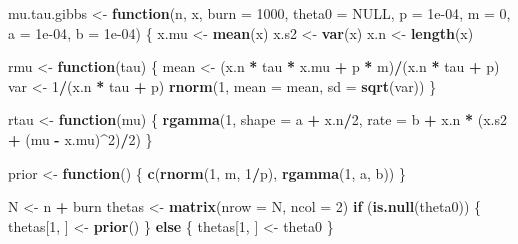 \documentclass[
  11pt,
]{paper}
\newenvironment{Shaded}{\begin{snugshade}}{\end{snugshade}}
\newcommand{\AttributeTok}[1]{\textcolor[rgb]{0.13,0.29,0.53}{#1}}
\newcommand{\ConstantTok}[1]{\textcolor[rgb]{0.56,0.35,0.01}{#1}}
\newcommand{\ControlFlowTok}[1]{\textcolor[rgb]{0.13,0.29,0.53}{\textbf{#1}}}
\newcommand{\DecValTok}[1]{\textcolor[rgb]{0.00,0.00,0.81}{#1}}
\newcommand{\FloatTok}[1]{\textcolor[rgb]{0.00,0.00,0.81}{#1}}
\newcommand{\FunctionTok}[1]{\textcolor[rgb]{0.13,0.29,0.53}{\textbf{#1}}}
\newcommand{\NormalTok}[1]{#1}
\newcommand{\OtherTok}[1]{\textcolor[rgb]{0.56,0.35,0.01}{#1}}
\newcommand{\SpecialCharTok}[1]{\textcolor[rgb]{0.81,0.36,0.00}{\textbf{#1}}}
\begin{document}
\begin{Shaded}
\begin{Highlighting}[]
\NormalTok{mu.tau.gibbs }\OtherTok{\textless{}{-}} \ControlFlowTok{function}\NormalTok{(n, x, }\AttributeTok{burn =} \DecValTok{1000}\NormalTok{, }\AttributeTok{theta0 =} \ConstantTok{NULL}\NormalTok{, }\AttributeTok{p =} \FloatTok{1e{-}04}\NormalTok{, }\AttributeTok{m =} \DecValTok{0}\NormalTok{, }\AttributeTok{a =} \FloatTok{1e{-}04}\NormalTok{,}
    \AttributeTok{b =} \FloatTok{1e{-}04}\NormalTok{) \{}
\NormalTok{    x.mu }\OtherTok{\textless{}{-}} \FunctionTok{mean}\NormalTok{(x)}
\NormalTok{    x.s2 }\OtherTok{\textless{}{-}} \FunctionTok{var}\NormalTok{(x)}
\NormalTok{    x.n }\OtherTok{\textless{}{-}} \FunctionTok{length}\NormalTok{(x)}

\NormalTok{    rmu }\OtherTok{\textless{}{-}} \ControlFlowTok{function}\NormalTok{(tau) \{}
\NormalTok{        mean }\OtherTok{\textless{}{-}}\NormalTok{ (x.n }\SpecialCharTok{*}\NormalTok{ tau }\SpecialCharTok{*}\NormalTok{ x.mu }\SpecialCharTok{+}\NormalTok{ p }\SpecialCharTok{*}\NormalTok{ m)}\SpecialCharTok{/}\NormalTok{(x.n }\SpecialCharTok{*}\NormalTok{ tau }\SpecialCharTok{+}\NormalTok{ p)}
\NormalTok{        var }\OtherTok{\textless{}{-}} \DecValTok{1}\SpecialCharTok{/}\NormalTok{(x.n }\SpecialCharTok{*}\NormalTok{ tau }\SpecialCharTok{+}\NormalTok{ p)}
        \FunctionTok{rnorm}\NormalTok{(}\DecValTok{1}\NormalTok{, }\AttributeTok{mean =}\NormalTok{ mean, }\AttributeTok{sd =} \FunctionTok{sqrt}\NormalTok{(var))}
\NormalTok{    \}}

\NormalTok{    rtau }\OtherTok{\textless{}{-}} \ControlFlowTok{function}\NormalTok{(mu) \{}
        \FunctionTok{rgamma}\NormalTok{(}\DecValTok{1}\NormalTok{, }\AttributeTok{shape =}\NormalTok{ a }\SpecialCharTok{+}\NormalTok{ x.n}\SpecialCharTok{/}\DecValTok{2}\NormalTok{, }\AttributeTok{rate =}\NormalTok{ b }\SpecialCharTok{+}\NormalTok{ x.n }\SpecialCharTok{*}\NormalTok{ (x.s2 }\SpecialCharTok{+}\NormalTok{ (mu }\SpecialCharTok{{-}}\NormalTok{ x.mu)}\SpecialCharTok{\^{}}\DecValTok{2}\NormalTok{)}\SpecialCharTok{/}\DecValTok{2}\NormalTok{)}
\NormalTok{    \}}

\NormalTok{    prior }\OtherTok{\textless{}{-}} \ControlFlowTok{function}\NormalTok{() \{}
        \FunctionTok{c}\NormalTok{(}\FunctionTok{rnorm}\NormalTok{(}\DecValTok{1}\NormalTok{, m, }\DecValTok{1}\SpecialCharTok{/}\NormalTok{p), }\FunctionTok{rgamma}\NormalTok{(}\DecValTok{1}\NormalTok{, a, b))}
\NormalTok{    \}}

\NormalTok{    N }\OtherTok{\textless{}{-}}\NormalTok{ n }\SpecialCharTok{+}\NormalTok{ burn}
\NormalTok{    thetas }\OtherTok{\textless{}{-}} \FunctionTok{matrix}\NormalTok{(}\AttributeTok{nrow =}\NormalTok{ N, }\AttributeTok{ncol =} \DecValTok{2}\NormalTok{)}
    \ControlFlowTok{if}\NormalTok{ (}\FunctionTok{is.null}\NormalTok{(theta0)) \{}
\NormalTok{        thetas[}\DecValTok{1}\NormalTok{, ] }\OtherTok{\textless{}{-}} \FunctionTok{prior}\NormalTok{()}
\NormalTok{    \} }\ControlFlowTok{else}\NormalTok{ \{}
\NormalTok{        thetas[}\DecValTok{1}\NormalTok{, ] }\OtherTok{\textless{}{-}}\NormalTok{ theta0}
\NormalTok{    \}}


\end{Highlighting}
\end{Shaded}
\end{document}
